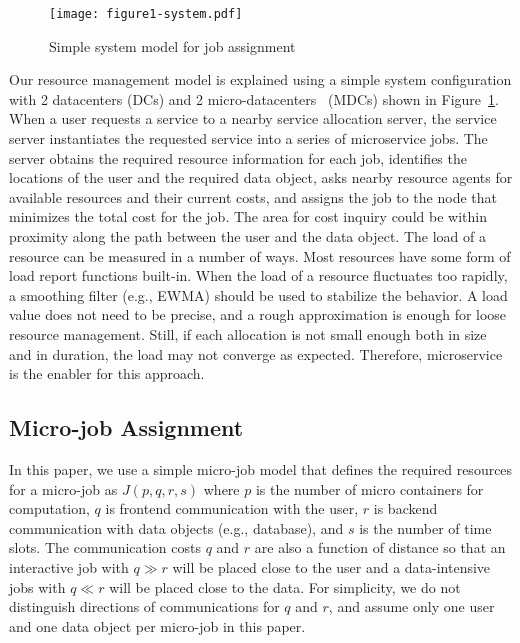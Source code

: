 
\begin{figure}[tb]
  \begin{center}
    \texttt{[image: figure1-system.pdf]}
    \vspace{-1.0ex}
    \caption{Simple system model for job assignment}
    \label{fig:system}
  \end{center}
\end{figure}

Our resource management model is explained using a simple system
configuration with 2 datacenters (DCs) and 2 micro-datacenters~\cite{Greenberg-2009} (MDCs)
shown in Figure~\ref{fig:system}.
When a user requests a service to a nearby service allocation server,
the service server instantiates the requested service into a series of
microservice jobs.
The server obtains the required resource information for each job,
identifies the locations of the user and the required data object,
asks nearby resource agents for available resources and their current costs,
and assigns the job to the node that minimizes the total cost for the
job.
The area for cost inquiry could be within proximity along the path
between the user and the data object.
The load of a resource can be measured in a number of ways.  Most
resources have some form of load report functions built-in.
When the load of a resource fluctuates too rapidly,
a smoothing filter (e.g., EWMA)
should be used to stabilize the behavior.
A load value does not need to be precise, and a rough approximation is
enough for loose resource management.
Still, if each allocation is not small enough both in size and in
duration, the load may not converge as expected.
Therefore, microservice is the enabler for this approach.

\subsection{Micro-job Assignment}

In this paper, we use a simple micro-job model that defines the
required resources for a micro-job as $J(p, q, r, s)$ where
$p$ is the number of micro containers for computation,
$q$ is frontend communication with the user,
$r$ is backend communication with data objects (e.g., database), and
$s$ is the number of time slots.
The communication costs $q$ and $r$ are also a function of distance so
that an interactive job with $q \gg r$ will be placed close to the
user and a data-intensive jobs with $q \ll r$ will be placed close to
the data.
For simplicity, we do not distinguish directions of
communications for $q$ and $r$, and assume only one user and one data
object per micro-job in this paper.

